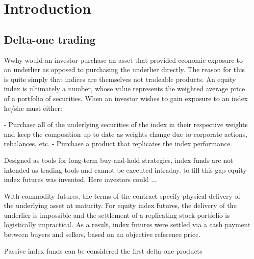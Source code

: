 \chapter{Introduction}






\section{Delta-one trading}
Wwhy would an investor purchase an asset that provided economic exposure to an underlier as opposed to purchasing the underlier directly. The reason for this is quite simply that indices are themselves not tradeable products. An equity index is ultimately a number, whose value represents the weighted average price of a portfolio of securities. When an investor wishes to gain exposure to an index he/she must either:

- Purchase all of the underlying securities of the index in their respective weights and keep the composition up to date as weights change due to corporate actions, rebalances, etc.
- Purchase a product that replicates the index performance.

Designed as tools for long-term buy-and-hold strategies, index funds are not intended as trading tools and cannot be executed intraday. to fill this gap equity index futures was invented. Here investors could ... 

With commodity futures, the terms of the contract specify physical delivery of the underlying asset at maturity. For equity index futures, the delivery of the underlier is impossible and the settlement of a replicating stock portfolio is logistically impractical. As a result, index futures were settled via a cash payment between buyers and sellers, based on an objective reference price.

Passive index funds can be considered the first delta-one products